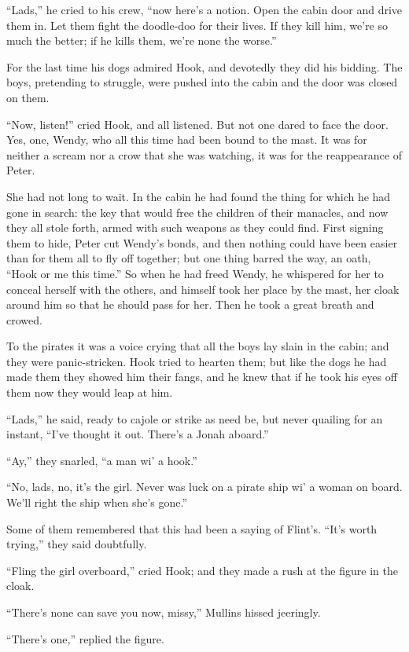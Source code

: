 ``Lads,'' he cried to his crew, ``now here's a notion. Open the cabin door
and drive them in. Let them fight the doodle-doo for their lives. If
they kill him, we're so much the better; if he kills them, we're none
the worse.''

For the last time his dogs admired Hook, and devotedly they did his
bidding. The boys, pretending to struggle, were pushed into the cabin
and the door was closed on them.

``Now, listen!'' cried Hook, and all listened. But not one dared to face
the door. Yes, one, Wendy, who all this time had been bound to the
mast. It was for neither a scream nor a crow that she was watching, it
was for the reappearance of Peter.

She had not long to wait. In the cabin he had found the thing for which
he had gone in search: the key that would free the children of their
manacles, and now they all stole forth, armed with such weapons as they
could find. First signing them to hide, Peter cut Wendy's bonds, and
then nothing could have been easier than for them all to fly off
together; but one thing barred the way, an oath, ``Hook or me this
time.'' So when he had freed Wendy, he whispered for her to conceal
herself with the others, and himself took her place by the mast, her
cloak around him so that he should pass for her. Then he took a great
breath and crowed.

To the pirates it was a voice crying that all the boys lay slain in the
cabin; and they were panic-stricken. Hook tried to hearten them; but
like the dogs he had made them they showed him their fangs, and he knew
that if he took his eyes off them now they would leap at him.

``Lads,'' he said, ready to cajole or strike as need be, but never
quailing for an instant, ``I've thought it out. There's a Jonah aboard.''

``Ay,'' they snarled, ``a man wi' a hook.''

``No, lads, no, it's the girl. Never was luck on a pirate ship wi' a
woman on board. We'll right the ship when she's gone.''

Some of them remembered that this had been a saying of Flint's. ``It's
worth trying,'' they said doubtfully.

``Fling the girl overboard,'' cried Hook; and they made a rush at the
figure in the cloak.

``There's none can save you now, missy,'' Mullins hissed jeeringly.

``There's one,'' replied the figure.

